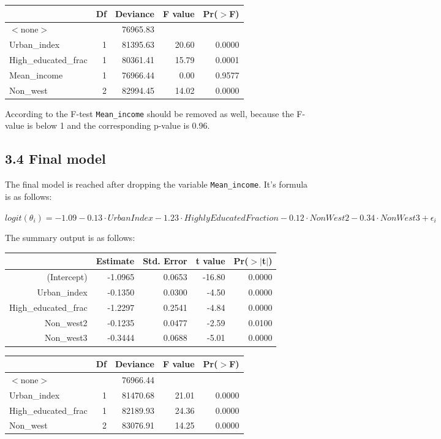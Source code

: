 \documentclass[11pt,]{article}
\begin{document}
\begin{table}[ht]
\centering
\begin{tabular}{lrrrr}
  \hline
 & Df & Deviance & F value & Pr($>$F) \\ 
  \hline
$<$none$>$ &  & 76965.83 &  &  \\ 
  Urban\_index & 1 & 81395.63 & 20.60 & 0.0000 \\ 
  High\_educated\_frac & 1 & 80361.41 & 15.79 & 0.0001 \\ 
  Mean\_income & 1 & 76966.44 & 0.00 & 0.9577 \\ 
  Non\_west & 2 & 82994.45 & 14.02 & 0.0000 \\ 
   \hline
\end{tabular}
\end{table}

According to the F-test \texttt{Mean\_income} should be removed as well,
because the F-value is below 1 and the corresponding p-value is 0.96.

\subsection{3.4 Final model}\label{final-model-1}

The final model is reached after dropping the variable
\texttt{Mean\_income}. It's formula is as follows:

\(logit(\theta_{i}) = -1.09 -0.13 \cdot UrbanIndex -1.23 \cdot HighlyEducatedFraction - 0.12 \cdot NonWest2 - 0.34 \cdot NonWest3 + \epsilon_i\)

The summary output is as follows:

\begin{table}[ht]
\centering
\begin{tabular}{rrrrr}
  \hline
 & Estimate & Std. Error & t value & Pr($>$$|$t$|$) \\ 
  \hline
(Intercept) & -1.0965 & 0.0653 & -16.80 & 0.0000 \\ 
  Urban\_index & -0.1350 & 0.0300 & -4.50 & 0.0000 \\ 
  High\_educated\_frac & -1.2297 & 0.2541 & -4.84 & 0.0000 \\ 
  Non\_west2 & -0.1235 & 0.0477 & -2.59 & 0.0100 \\ 
  Non\_west3 & -0.3444 & 0.0688 & -5.01 & 0.0000 \\ 
   \hline
\end{tabular}
\end{table}

\begin{table}[ht]
\centering
\begin{tabular}{lrrrr}
  \hline
 & Df & Deviance & F value & Pr($>$F) \\ 
  \hline
$<$none$>$ &  & 76966.44 &  &  \\ 
  Urban\_index & 1 & 81470.68 & 21.01 & 0.0000 \\ 
  High\_educated\_frac & 1 & 82189.93 & 24.36 & 0.0000 \\ 
  Non\_west & 2 & 83076.91 & 14.25 & 0.0000 \\ 
   \hline
\end{tabular}
\end{table}
\end{document}
